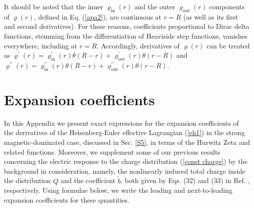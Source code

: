\documentclass[12pt]{article}
\begin{document}
\begin{appendices}
It should be noted that the inner $\varrho _{\mathrm{in}}\left( r\right) $
and the outer $\varrho _{\mathrm{out}}\left( r\right) $ components of $%
\varrho \left( r\right) $, defined in Eq. (\ref{apa2}), are continuous at $%
r=R$ (as well as its first and second derivatives). For these reasons,
coefficients proportional to Dirac delta functions, stemming from the
differentiation of Heaviside step functions, vanishes everywhere, including
at $r=R$. Accordingly, derivatives of $\varrho \left( r\right) $ can be
treated as $\varrho ^{\prime }\left( r\right) =\varrho _{\mathrm{in}%
}^{\prime }\left( r\right) \theta \left( R-r\right) +\varrho _{\mathrm{out}%
}^{\prime }\left( r\right) \theta \left( r-R\right) $ and $\varrho ^{\prime
\prime }\left( r\right) =\varrho _{\mathrm{in}}^{\prime \prime }\left(
r\right) \theta \left( R-r\right) +\varrho _{\mathrm{out}}^{\prime \prime
}\left( r\right) \theta \left( r-R\right) $.

\section{Expansion coefficients\label{AppeB}}

In this Appendix we present exact expressions for the expansion coefficients
of the derivatives of the Heisenberg-Euler effective Lagrangian (\ref{eh1})
in the strong magnetic-dominated case, discussed in Sec. \ref{S5}, in terms
of the Hurwitz Zeta and related functions. Moreover, we supplement some of
our previous results concerning the electric response to the charge
distribution (\ref{const charge}) by the background in consideration,
namely, the nonlinearly induced total charge inside the distribution $Q$ and
the coefficient $\tilde{b}$, both given by Eqs. (32) and (33) in Ref. \cite%
{AdoGitSha2016}, respectively. Using formulae below, we write the leading
and next-to-leading expansion coefficients for these quantities.


\end{appendices}
\end{document}
